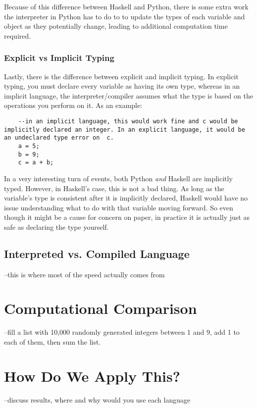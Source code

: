 \documentclass{article}
\begin{document}
    \medskip\noindent Because of this difference between Haskell and Python, there is some extra work the interpreter in Python has to do to to update the types of each variable and object as they potentially change, leading to additional computation time required. 
    
    \subsubsection{Explicit vs Implicit Typing}
    Lastly, there is the difference between explicit and implicit typing. In explicit typing, you must declare every variable as having its own type, whereas in an implicit language, the interpreter/compiler assumes what the type is based on the operations you perform on it. As an example: 
    
    \begin{lstlisting}
    --in an implicit language, this would work fine and c would be implicitly declared an integer. In an explicit language, it would be an undeclared type error on  c. 
    a = 5;
    b = 9;
    c = a + b;
    \end{lstlisting}
    
    \medskip\noindent In a very interesting turn of events, both Python \textit{and} Haskell are implicitly typed. However, in Haskell's case, this is not a bad thing. As long as the variable's type is consistent after it is implicitly declared, Haskell would have no issue understanding what to do with that variable moving forward. So even though it might be a cause for concern on paper, in practice it is actually just as safe as declaring the type yourself.  

    \subsection{Interpreted vs. Compiled Language}
    --this is where most of the speed actually comes from 
    

\section{Computational Comparison}
--fill a list with 10,000 randomly generated integers between 1 and 9, add 1 to each of them, then sum the list. 

\section{How Do We Apply This?}
--discuss results, where and why would you use each language 
\end{document}
